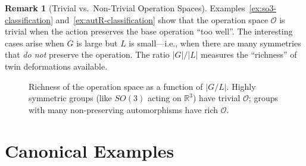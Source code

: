 \documentclass[11pt,a4paper,openany]{book}
\theoremstyle{plain}
\theoremstyle{definition}
\newtheorem{remark}[theorem]{Remark}
\newcommand{\opspace}{\mathcal{O}}
\newcommand{\lingroup}{L}
\newcommand{\groupG}{G}
\newcommand{\RR}{\mathbb{R}}
\newcommand{\ZZ}{\mathbb{Z}}
\begin{document}
\begin{remark}[Trivial vs.~Non-Trivial Operation Spaces]
Examples~\ref{ex:so3-classification} and~\ref{ex:autR-classification} show that the operation space $\opspace$ is trivial when the action preserves the base operation ``too well''. The interesting cases arise when $\groupG$ is large but $\lingroup$ is small---i.e., when there are many symmetries that \emph{do not} preserve the operation. The ratio $|\groupG|/|\lingroup|$ measures the ``richness'' of twin deformations available.
\end{remark}

\begin{figure}[ht]
\centering
{}
\caption{Richness of the operation space as a function of $|\groupG/\lingroup|$. Highly symmetric groups (like $SO(3)$ acting on $\RR^3$) have trivial $\opspace$; groups with many non-preserving automorphisms have rich $\opspace$.}
\label{fig:richness}
\end{figure}


\chapter{Canonical Examples}
\label{ch:examples}
\end{document}
